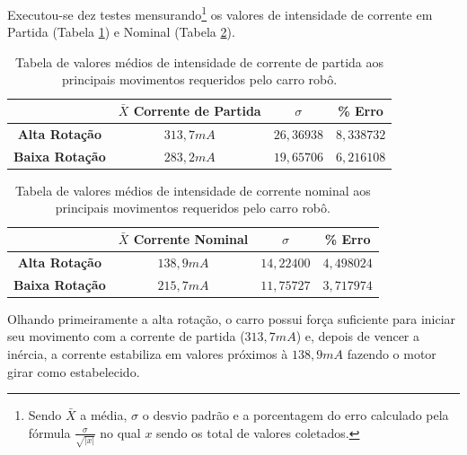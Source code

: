	Executou-se dez testes mensurando\footnote{Sendo $\bar{X}$ a média, $\sigma$ o desvio padrão e a porcentagem do erro calculado pela fórmula $\frac{\sigma}{\sqrt{|x|}}$ no qual $x$ sendo os total de valores coletados.} os valores de intensidade de corrente em Partida (Tabela \ref{tab:corrente_partida}) e Nominal (Tabela \ref{tab:corrente_nominal}).%

	\begin{table}[H]
    	\centering
    	\caption{Tabela de valores médios de intensidade de corrente de partida aos principais movimentos requeridos pelo carro robô.}
	    \begin{tabular}{|c||c|c|c|} \hline
	    ~                      & $\bar{X}$ \textbf{Corrente de Partida}   & $\sigma$   & \textbf{\% Erro} \\ \hline \hline
	    \textbf{Alta  Rotação} & $313,7mA$                                & $26,36938$ & $8,338732$    \\ \hline
	    \textbf{Baixa Rotação} & $283,2mA$                                & $19,65706$ & $6,216108$    \\
	     \hline
	    \end{tabular}   \label{tab:corrente_partida}
	\end{table}

	\begin{table}[H]
    	\centering
    	\caption{Tabela de valores médios de intensidade de corrente nominal aos principais movimentos requeridos pelo carro robô.}
	    \begin{tabular}{|c||c|c|c|} \hline
	    ~                      & $\bar{X}$ \textbf{Corrente Nominal} & $\sigma$   & \textbf{\% Erro} \\ \hline \hline
	    \textbf{Alta  Rotação} & $138,9mA$                           & $14,22400$ & $4,498024$     \\ \hline
	    \textbf{Baixa Rotação} & $215,7mA$                           & $11,75727$ & $3,717974$     \\ 
	     \hline
	    \end{tabular}   \label{tab:corrente_nominal}
	\end{table}

		Olhando primeiramente a alta rotação, o carro possui força suficiente para iniciar seu movimento com a corrente de partida ($313,7mA$) e, depois de vencer a inércia, a corrente estabiliza em valores próximos à $138,9mA$ fazendo o motor girar como estabelecido. 

